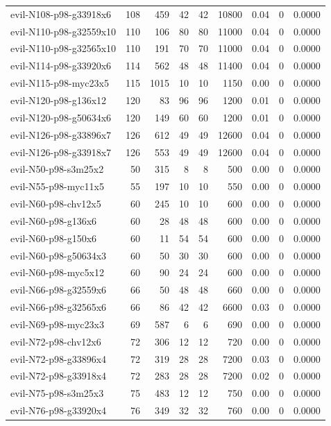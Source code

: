 {\begin{longtable}{lrrrrrrrr}
evil-N108-p98-g33918x6 & 108 & 459 & 42 & 42 & 10800 & 0.04 & 0 & 0.0000 \\
evil-N110-p98-g32559x10 & 110 & 106 & 80 & 80 & 11000 & 0.04 & 0 & 0.0000 \\
evil-N110-p98-g32565x10 & 110 & 191 & 70 & 70 & 11000 & 0.04 & 0 & 0.0000 \\
evil-N114-p98-g33920x6 & 114 & 562 & 48 & 48 & 11400 & 0.04 & 0 & 0.0000 \\
evil-N115-p98-myc23x5 & 115 & 1015 & 10 & 10 & 1150 & 0.00 & 0 & 0.0000 \\
evil-N120-p98-g136x12 & 120 & 83 & 96 & 96 & 1200 & 0.01 & 0 & 0.0000 \\
evil-N120-p98-g50634x6 & 120 & 149 & 60 & 60 & 1200 & 0.01 & 0 & 0.0000 \\
evil-N126-p98-g33896x7 & 126 & 612 & 49 & 49 & 12600 & 0.04 & 0 & 0.0000 \\
evil-N126-p98-g33918x7 & 126 & 553 & 49 & 49 & 12600 & 0.04 & 0 & 0.0000 \\
evil-N50-p98-s3m25x2 & 50 & 315 & 8 & 8 & 500 & 0.00 & 0 & 0.0000 \\
evil-N55-p98-myc11x5 & 55 & 197 & 10 & 10 & 550 & 0.00 & 0 & 0.0000 \\
evil-N60-p98-chv12x5 & 60 & 245 & 10 & 10 & 600 & 0.00 & 0 & 0.0000 \\
evil-N60-p98-g136x6 & 60 & 28 & 48 & 48 & 600 & 0.00 & 0 & 0.0000 \\
evil-N60-p98-g150x6 & 60 & 11 & 54 & 54 & 600 & 0.00 & 0 & 0.0000 \\
evil-N60-p98-g50634x3 & 60 & 50 & 30 & 30 & 600 & 0.00 & 0 & 0.0000 \\
evil-N60-p98-myc5x12 & 60 & 90 & 24 & 24 & 600 & 0.00 & 0 & 0.0000 \\
evil-N66-p98-g32559x6 & 66 & 50 & 48 & 48 & 660 & 0.00 & 0 & 0.0000 \\
evil-N66-p98-g32565x6 & 66 & 86 & 42 & 42 & 6600 & 0.03 & 0 & 0.0000 \\
evil-N69-p98-myc23x3 & 69 & 587 & 6 & 6 & 690 & 0.00 & 0 & 0.0000 \\
evil-N72-p98-chv12x6 & 72 & 306 & 12 & 12 & 720 & 0.00 & 0 & 0.0000 \\
evil-N72-p98-g33896x4 & 72 & 319 & 28 & 28 & 7200 & 0.03 & 0 & 0.0000 \\
evil-N72-p98-g33918x4 & 72 & 283 & 28 & 28 & 7200 & 0.02 & 0 & 0.0000 \\
evil-N75-p98-s3m25x3 & 75 & 483 & 12 & 12 & 750 & 0.00 & 0 & 0.0000 \\
evil-N76-p98-g33920x4 & 76 & 349 & 32 & 32 & 760 & 0.00 & 0 & 0.0000 \\

\end{longtable}}
